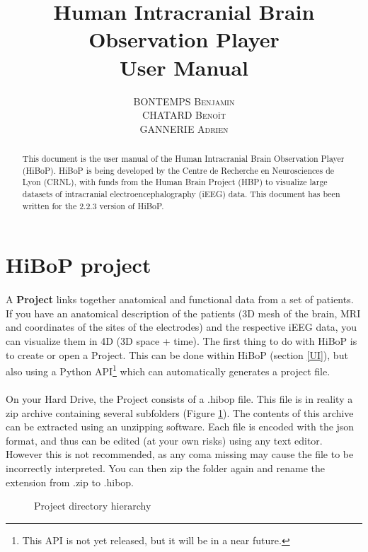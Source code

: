 \documentclass[a4paper]{article}
\title{Human Intracranial Brain Observation Player \\ User Manual}
\author{\textsc{BONTEMPS Benjamin} \\ \textsc{CHATARD Benoît} \\ \textsc{GANNERIE Adrien}}
\begin{document}
\maketitle
\begin{abstract}
This document is the user manual of the Human Intracranial Brain Observation Player (HiBoP). HiBoP is being developed by the Centre de Recherche en Neurosciences de Lyon (CRNL), with funds from the Human Brain Project (HBP) to visualize large datasets of intracranial electroencephalography (iEEG) data. This document has been written for the 2.2.3 version of HiBoP.
\end{abstract}
\tableofcontents
\section{HiBoP project} \label{data}
\paragraph{} A \textbf{Project} links together anatomical and functional data from a set of patients. If you have an anatomical description of the patients (3D mesh of the brain, MRI and coordinates of the sites of the electrodes) and the respective iEEG data, you can visualize them in 4D (3D space + time). The first thing to do with HiBoP is to create or open a Project. This can be done within HiBoP (section \ref{UI}), but also using a Python API\footnote{This API is not yet released, but it will be in a near future.} which can automatically generates a project file.
\paragraph{} On your Hard Drive, the Project consists of a .hibop file. This file is in reality a zip archive containing several subfolders (Figure \ref{projectDirectory}). The contents of this archive can be extracted using an unzipping software. Each file is encoded with the json format, and thus can be edited (at your own risks) using any text editor. However this is not recommended, as any coma missing may cause the file to be incorrectly interpreted. You can then zip the folder again and rename the extension from .zip to .hibop.
\begin{figure}[H]
\caption{\label{projectDirectory}Project directory hierarchy}
\end{figure}
\end{document}
